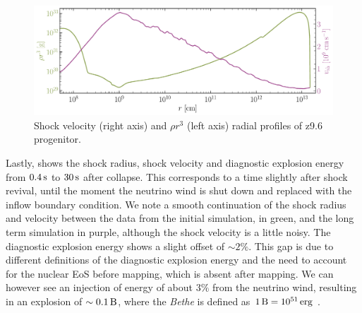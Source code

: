 \begin{figure}[ht!]
    \centering
    \includegraphics[width=1.0\linewidth]{figures/shock_vel.pdf}
    \caption{Shock velocity (right axis) and \(\rho r^3\) (left axis) radial profiles of z9.6 progenitor.}
    \label{fig:shock_vel}
\end{figure}

Lastly,  shows the shock radius, shock velocity and diagnostic explosion energy from \(0.4\,\mathrm{s}\) to \(30\,\mathrm{s}\) after collapse. This corresponds to a time slightly after shock revival, until the moment the neutrino wind is shut down and replaced with the inflow boundary condition. We note a smooth continuation of the shock radius and velocity between the data from the initial simulation, in green, and the long term simulation in purple, although the shock velocity is a little noisy. The diagnostic explosion energy shows a slight offset of \(\sim2\%\). This gap is due to different definitions of the diagnostic explosion energy and the need to account for the nuclear EoS before mapping, which is absent after mapping. We can however see an injection of energy of about \(3\%\) from the neutrino wind, resulting in an explosion of \(\sim0.1\,\mathrm{B}\), where the \emph{Bethe} is defined as \(1\,\mathrm{B} = 10^{51}\,\mathrm{erg}\) \citep{Weinberg2006}.

